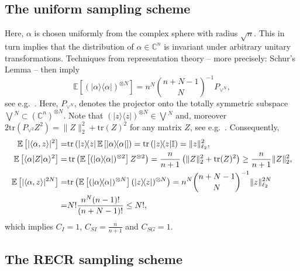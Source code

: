 \subsection{The uniform sampling scheme}

Here, $\alpha$ is chosen uniformly from the complex sphere with radius $\sqrt{n}$.
This in turn implies that the distribution of $\alpha \in \mathbb{C}^n$ is invariant under arbitrary unitary transformations.
Techniques from representation theory -- more precisely: Schur's Lemma -- then imply
\[
  \label{eq:from_schur}
  \mathbb{E} \left[ (|\alpha \rangle \! \langle \alpha| )^{\otimes N} \right] =
  n^N \binom{n+N-1}{N}^{-1} P_{\vee^N},
\]
see e.g.\ \cite[Lemma~1]{Scott_2006_Tight}.
Here, $P_{\vee^N}$, denotes the projector onto the totally symmetric subspace $\bigvee\!^N \subset \left( \mathbb{C}^n \right)^{\otimes N}$.
Note that $\left(| z \rangle \! \langle  z| \right)^{\otimes N} \in \bigvee\!^N$ and, moreover $2 \mathrm{tr} \left( P_{\vee^2} Z^2 \right)= \| Z \|_2^2 + \mathrm{tr} (Z)^2$ for any matrix $Z$, see e.g.\ \cite[Lemma~17]{Kueng_2016_Low}.
Consequently,
\begin{align*}
  \mathbb{E} \left[ | \langle\alpha, z \rangle|^2 \right]
  =& \mathrm{tr} \left( | z \rangle \! \langle  z| \, \mathbb{E} \left[ |\alpha \rangle \! \langle\alpha| \right] \right)
  = \mathrm{tr} \left( | z \rangle \! \langle  z| \mathbb{I} \right) = \|  z \|_{\ell_2}^2, \\
  \mathbb{E} \left[
  \langle\alpha| Z |\alpha \rangle^2 \right]
  =& \operatorname{tr} \left( \mathbb{E} \left[ (|\alpha \rangle \! \langle\alpha|)^{\otimes 2} \right] Z^{\otimes 2} \right)
  = \frac{n}{n+1} \left( \| Z \|_2^2 + \mathrm{tr}(Z)^2 \right) \geq \frac{n}{n+1} \| Z \|_2^2, \\
  \mathbb{E} \left[ | \langle\alpha,  z \rangle |^{2N} \right]
  =& \mathrm{tr} \left(\mathbb{E} \left[ (|\alpha \rangle \! \langle\alpha|)^{\otimes N} \right]  (| z\rangle \! \langle  z|)^{\otimes N}  \right)
  = n^N \binom{n+N-1}{N}^{-1} \|  z \|_{\ell_2}^{2N} \\
  =& N! \frac{n^N (n-1)!}{(n+N-1)!} \leq N!,
\end{align*}
which implies $C_I=1$, $C_{SI} = \frac{n}{n+1}$ and $C_{SG}=1$.


\subsection{The RECR sampling scheme}

